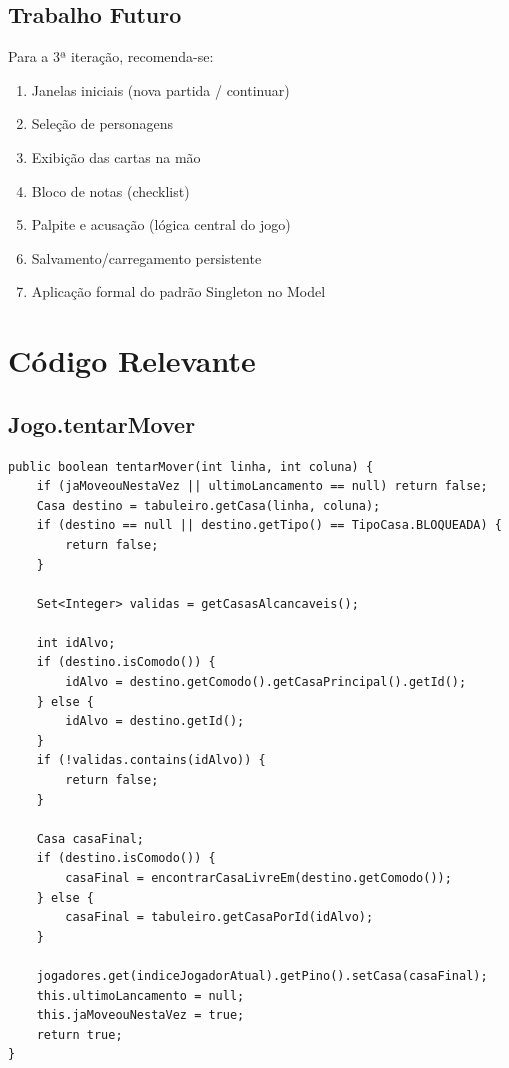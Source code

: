 \documentclass[12pt,a4paper]{report}
\begin{document}
\section{Trabalho Futuro}

Para a 3ª iteração, recomenda-se:

\begin{enumerate}
    \item Janelas iniciais (nova partida / continuar)
    \item Seleção de personagens
    \item Exibição das cartas na mão
    \item Bloco de notas (checklist)
    \item Palpite e acusação (lógica central do jogo)
    \item Salvamento/carregamento persistente
    \item Aplicação formal do padrão Singleton no Model
\end{enumerate}

\appendix

\chapter{Código Relevante}

\section{Jogo.tentarMover}

\begin{lstlisting}
public boolean tentarMover(int linha, int coluna) {
    if (jaMoveouNestaVez || ultimoLancamento == null) return false;
    Casa destino = tabuleiro.getCasa(linha, coluna);
    if (destino == null || destino.getTipo() == TipoCasa.BLOQUEADA) {
        return false;
    }

    Set<Integer> validas = getCasasAlcancaveis();

    int idAlvo;
    if (destino.isComodo()) {
        idAlvo = destino.getComodo().getCasaPrincipal().getId();
    } else {
        idAlvo = destino.getId();
    }
    if (!validas.contains(idAlvo)) {
        return false;
    }

    Casa casaFinal;
    if (destino.isComodo()) {
        casaFinal = encontrarCasaLivreEm(destino.getComodo());
    } else {
        casaFinal = tabuleiro.getCasaPorId(idAlvo);
    }

    jogadores.get(indiceJogadorAtual).getPino().setCasa(casaFinal);
    this.ultimoLancamento = null;
    this.jaMoveouNestaVez = true;
    return true;
}
\end{lstlisting}
\end{document}

